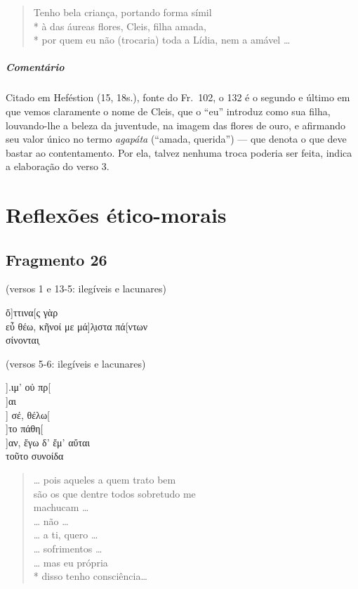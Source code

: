 {\begin{verse}
Tenho bela criança, portando forma símil\\*
à das áureas flores, Cleis, filha amada,\\*
por quem eu não (trocaria) toda a Lídia, nem a amável \ldots{}
\end{verse}

{\paragraph{Comentário} Citado em Heféstion (15, 18s.), fonte do Fr.~102, o 132 é o segundo e último em que vemos claramente o nome de Cleis, que o “eu” introduz como sua filha, louvando-lhe a
beleza da juventude, na imagem das flores de ouro, e afirmando seu valor único no termo \textit{agapáta} (``amada, querida'') --- que denota o que deve bastar ao contentamento. Por ela,  talvez nenhuma troca poderia ser feita, indica a elaboração do verso 3.}



\chapter{Reflexões ético-morais}

\section{Fragmento 26} 

\begin{gkverse}
\textnormal{(versos 1 e 13-5: ilegíveis e lacunares)}

ὄ]ττινα[ς γὰρ\\
εὖ θέω, κῆνοί με μά]λ̣ιστα πά[ντων\\
σίνονται̣

\textnormal{(versos 5-6: ilegíveis e lacunares)}

           ].ιμ’ οὐ πρ[\\
  ]αι\\
  ] σέ, θέλω[\\
  ]το πάθη[\\
         ]αν, ἔγω δ’ ἔμ’ αὔται\\
τοῦτο συνοίδα
\end{gkverse}

\begin{verse}
\ldots{} pois aqueles a quem trato bem\\
são os que dentre todos sobretudo me\\
machucam \ldots{}\\
\ldots{} não \ldots{}\\
\ldots{} a ti, quero \ldots{}\\
\ldots{} sofrimentos \ldots{}\\
\ldots{} mas eu própria\\*
disso tenho consciência\ldots{}
\end{verse}

}
